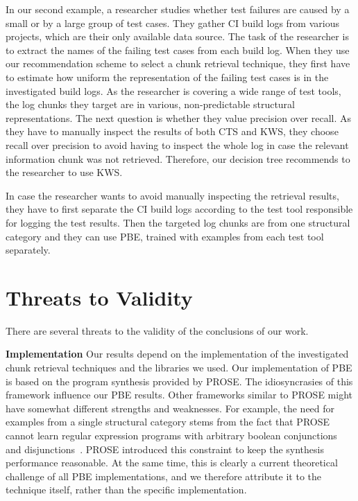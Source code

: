 In our second example, a researcher studies whether test failures
are caused by a small or by a large group of test cases.
They gather
CI build logs from various projects, which are their only available
data source.
The task of the researcher is to extract the names of the
failing test cases from each build log.
When they use our
recommendation scheme to select a chunk retrieval technique, they
first have to estimate how uniform the representation of the failing
test cases is in the investigated build logs.
As the researcher is
covering a wide range of test tools, the
log chunks they target are in various, non-predictable structural
representations.
The next question is whether they value precision
over recall.
As they have to manually inspect the results of both CTS
and KWS, they choose recall over precision to avoid having to inspect
the whole log in case the relevant information chunk was not
retrieved.
Therefore, our decision tree recommends to the researcher to use KWS\@.

In case the researcher wants to avoid manually inspecting the
retrieval results, they have to first separate the CI build logs
according to the test tool responsible for logging the test results.
Then the targeted log chunks are from one structural category and they
can use PBE, trained with examples from each test tool separately.

\section{Threats to Validity}
There are several threats to the validity of the conclusions of our
work.


\textbf{Implementation}
Our results depend on the implementation of the investigated chunk
retrieval techniques and the libraries we used.
Our implementation of
PBE is based on the program synthesis provided by PROSE\@.
The
idiosyncrasies of this framework influence our PBE results.
Other
frameworks similar to PROSE might have somewhat different strengths
and weaknesses.
For example, the need for examples from a single
structural category stems from the fact that PROSE cannot learn
regular expression programs with arbitrary boolean conjunctions and
disjunctions~\cite{mayer2015user}.
PROSE introduced this constraint to
keep the synthesis performance reasonable.
At the same time, this is
clearly a current theoretical challenge of all PBE implementations,
and we therefore attribute it to the technique itself, rather than the
specific implementation.


